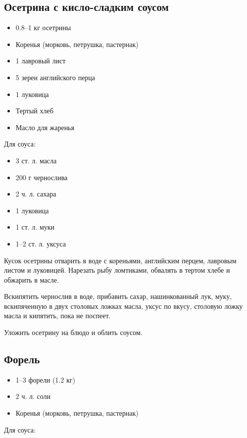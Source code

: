\subsection{Осетрина с кисло-сладким соусом}

\begin{itemize}
	\item 0.8–1 кг осетрины 
    \item Коренья (морковь, петрушка, пастернак) 
    \item 1 лавровый лист 
    \item 5 зерен английского перца 
    \item 1 луковица 
    \item Тертый хлеб 
    \item Масло для жаренья
\end{itemize}

Для соуса: 

\begin{itemize}
	\item 3 ст. л. масла 
    \item 200 г чернослива 
    \item 2 ч. л. сахара 
    \item 1 луковица
    \item 1 ст. л. муки
    \item 1–2 ст. л. уксуса
\end{itemize}

Кусок осетрины отварить в воде с кореньями, английским перцем, лавровым листом и луковицей. Нарезать рыбу ломтиками, обвалять в тертом хлебе и обжарить в масле.

Вскипятить чернослив в воде, прибавить сахар, нашинкованный лук, муку, вскипяченную в двух столовых ложках масла, уксус по вкусу, столовую ложку масла и кипятить, пока не поспеет.

Уложить осетрину на блюдо и облить соусом.

\subsection{Форель}

\begin{itemize}
	\item 1–3 форели (1.2 кг) 
    \item 2 ч. л. соли 
    \item Коренья (морковь, петрушка, пастернак)
\end{itemize}
    
Для соуса:

